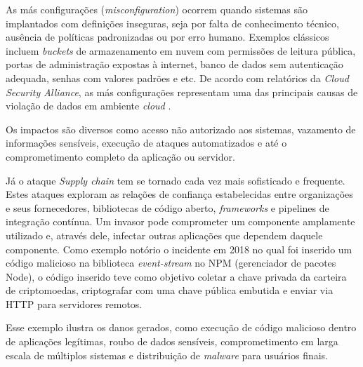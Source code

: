 As más configurações (\textit{misconfiguration}) ocorrem quando sistemas são implantados com definições inseguras, seja por falta de conhecimento técnico, ausência de políticas padronizadas ou por erro humano. Exemplos clássicos incluem \textit{buckets} de armazenamento em nuvem com permissões de leitura pública, portas de administração expostas à internet, banco de dados sem autenticação adequada, senhas com valores padrões e etc. De acordo com relatórios da \textit{Cloud Security Alliance}, as más configurações representam uma das principais causas de violação de dados em ambiente \textit{cloud} \cite{cloudsecurityalliance:2024}.

Os impactos são diversos como acesso não autorizado aos sistemas, vazamento de informações sensíveis, execução de ataques automatizados e até o comprometimento completo da aplicação ou servidor.

Já o ataque \textit{Supply chain} tem se tornado cada vez mais sofisticado e frequente. Estes ataques exploram as relações de confiança estabelecidas entre organizações e seus fornecedores, bibliotecas de código aberto, \textit{frameworks} e pipelines de integração contínua. Um invasor pode comprometer um componente amplamente utilizado e, através dele, infectar outras aplicações que dependem daquele componente. Como exemplo notório o incidente em 2018 no qual foi inserido um código malicioso na biblioteca \textit{event-stream} no NPM (gerenciador de pacotes Node\textit{}), o código inserido teve como objetivo coletar a chave privada da carteira de criptomoedas, criptografar com uma chave pública embutida e enviar via HTTP para servidores remotos.

Esse exemplo ilustra os danos gerados, como execução de código malicioso dentro de aplicações legítimas, roubo de dados sensíveis, comprometimento em larga escala de múltiplos sistemas e distribuição de \textit{malware} para usuários finais.
